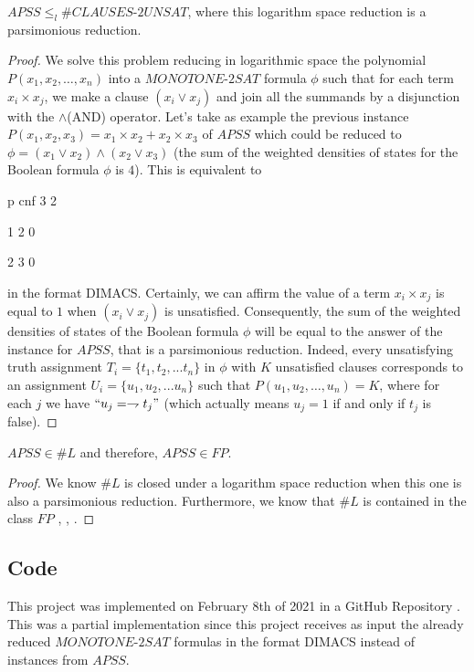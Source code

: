 \documentclass[a4paper,UKenglish,cleveref, autoref]{lipics-v2019}
\begin{document}
\begin{theorem}
\label{reduction}
$APSS \leq_{l} \#\textit{CLAUSES-2UNSAT}$, where this logarithm space reduction is a parsimonious reduction.
\end{theorem}

\begin{proof}
We solve this problem reducing in logarithmic space the polynomial $P(x_{1}, x_{2}, \ldots, x_{n})$ into a $\textit{MONOTONE-2SAT}$ formula $\phi$ such that for each term $x_{i} \times x_{j}$, we make a clause $(x_{i} \vee x_{j})$ and join all the summands by a disjunction with the $\wedge$(AND) operator. Let's take as example the previous instance $P(x_{1}, x_{2}, x_{3}) = x_{1} \times x_{2} + x_{2} \times x_{3}$ of $APSS$ which could be reduced to $\phi = (x_{1} \vee x_{2}) \wedge (x_{2} \vee x_{3})$ (the sum of the weighted densities of states for the Boolean formula $\phi$ is $4$). This is equivalent to

p cnf 3 2

1 2 0

2 3 0 

in the format DIMACS. Certainly, we can affirm the value of a term $x_{i} \times x_{j}$ is equal to $1$ when $(x_{i} \vee x_{j})$ is unsatisfied. Consequently, the sum of the weighted densities of states of the Boolean formula $\phi$ will be equal to the answer of the instance for $APSS$, that is a parsimonious reduction. Indeed, every unsatisfying truth assignment $T_{i} = \{t_{1}, t_{2}, ... t_{n}\}$ in $\phi$ with $K$ unsatisfied clauses corresponds to an assignment $U_{i} = \{u_{1}, u_{2}, ... u_{n}\}$ such that $P(u_{1}, u_{2}, \ldots, u_{n}) = K$, where for each $j$ we have $``u_{j} = \rightharpoondown t_{j}"$ (which actually means $u_{j} = 1$ if and only if $t_{j}$ is false).
\end{proof}

\begin{theorem}
\label{final}
$APSS \in \#L$ and therefore, $APSS \in FP$.
\end{theorem}

\begin{proof}
We know $\#L$ is closed under a logarithm space reduction when this one is also a parsimonious reduction. Furthermore, we know that $\#L$ is contained in the class $FP$ \cite{AJ93}, \cite{BCP83}, \cite{AB09}.
\end{proof}

\subsection{Code}

This project was implemented on February 8th of 2021 in a GitHub Repository \cite{FV21}. This was a partial implementation since this project receives as input the already reduced $\textit{MONOTONE-2SAT}$ formulas in the format DIMACS instead of instances from $APSS$.


\end{document}
